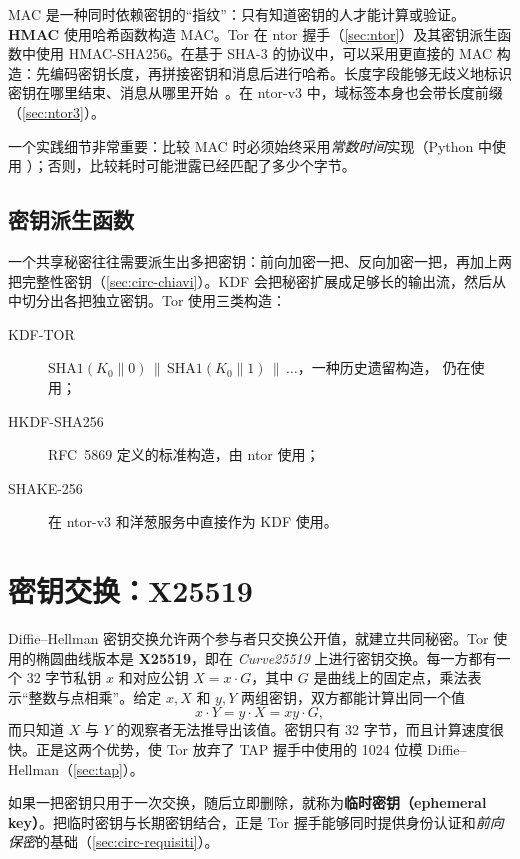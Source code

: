 MAC 是一种同时依赖密钥的“指纹”：只有知道密钥的人才能计算或验证。\textbf{HMAC} 使用哈希函数构造 MAC。Tor 在 ntor 握手（\cref{sec:ntor}）及其密钥派生函数中使用 HMAC-SHA256。在基于 SHA-3 的协议中，可以采用更直接的 MAC 构造：先编码密钥长度，再拼接密钥和消息后进行哈希。长度字段能够无歧义地标识密钥在哪里结束、消息从哪里开始~。在 ntor-v3 中，域标签本身也会带长度前缀（\cref{sec:ntor3}）。

一个实践细节非常重要：比较 MAC 时必须始终采用\emph{常数时间}实现（Python 中使用 ）；否则，比较耗时可能泄露已经匹配了多少个字节。

\subsection{密钥派生函数}

一个共享秘密往往需要派生出多把密钥：前向加密一把、反向加密一把，再加上两把完整性密钥（\cref{sec:circ-chiavi}）。KDF 会把秘密扩展成足够长的输出流，然后从中切分出各把独立密钥。Tor 使用三类构造：
\begin{description}
  \item[KDF-TOR] $\mathrm{SHA1}(K_0 \| 0) \,\|\, \mathrm{SHA1}(K_0 \| 1) \,\|\, \ldots$，一种历史遗留构造， 仍在使用；
  \item[HKDF-SHA256] RFC~5869 定义的标准构造，由 ntor 使用；
  \item[SHAKE-256] 在 ntor-v3 和洋葱服务中直接作为 KDF 使用。
\end{description}

\section{密钥交换：X25519}\label{sec:cripto-dh}

Diffie--Hellman 密钥交换允许两个参与者只交换公开值，就建立共同秘密。Tor 使用的椭圆曲线版本是 \textbf{X25519}，即在 \emph{Curve25519} 上进行密钥交换。每一方都有一个 32 字节私钥 $x$ 和对应公钥 $X = x \cdot G$，其中 $G$ 是曲线上的固定点，乘法表示“整数与点相乘”。给定 $x, X$ 和 $y, Y$ 两组密钥，双方都能计算出同一个值
\[
x \cdot Y = y \cdot X = xy \cdot G,
\]
而只知道 $X$ 与 $Y$ 的观察者无法推导出该值。密钥只有 32 字节，而且计算速度很快。正是这两个优势，使 Tor 放弃了 TAP 握手中使用的 1024 位模 Diffie--Hellman（\cref{sec:tap}）。

如果一把密钥只用于一次交换，随后立即删除，就称为\textbf{临时密钥（ephemeral key）}。把临时密钥与长期密钥结合，正是 Tor 握手能够同时提供身份认证和\emph{前向保密}的基础（\cref{sec:circ-requisiti}）。

